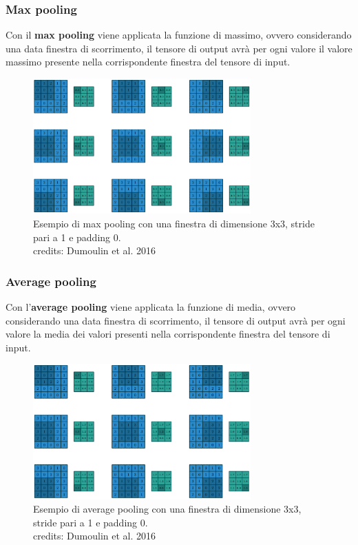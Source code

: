 \subsubsection{Max pooling} 
Con il \textbf{max pooling} viene applicata la funzione di massimo, ovvero considerando una data finestra di scorrimento, il tensore di output avrà
per ogni valore il valore massimo presente nella corrispondente finestra del tensore di input.
    \begin{figure}[H]
        \centering
        \includegraphics[width=0.745\textwidth]{imgs/max_pooling.png}
        \caption{Esempio di max pooling con una finestra di dimensione 3x3, stride pari a 1 e padding 0.\\
        credits: Dumoulin et al. 2016 \cite{dumoulin2016guide}}
        \label{fig:max_pooling}
    \end{figure}
    
\subsubsection{Average pooling}
Con l'\textbf{average pooling} viene applicata la funzione di media, ovvero considerando una data finestra di scorrimento, il tensore di output avrà
per ogni valore la media dei valori presenti nella corrispondente finestra del tensore di input.
    \begin{figure}[H]
        \centering
        \includegraphics[width=0.745\textwidth]{imgs/avg_pooling.png}
        \caption{Esempio di average pooling con una finestra di dimensione 3x3, stride pari a 1 e padding 0.\\
        credits: Dumoulin et al. 2016 \cite{dumoulin2016guide}}
        \label{fig:average_pooling}
    \end{figure}

